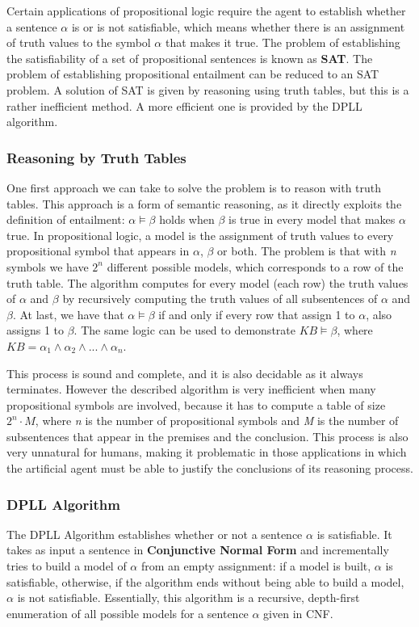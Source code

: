 \documentclass{article}
\begin{document}
Certain applications of propositional logic require the agent to establish whether a sentence \(\alpha\) is or is not satisfiable, which means whether there is an assignment of truth values to the symbol \(\alpha\) that makes it true. The problem of establishing the satisfiability of a set of propositional sentences is known as \textbf{SAT}. The problem of establishing propositional entailment can be reduced to an SAT problem. A solution of SAT is given by reasoning using truth tables, but this is a rather inefficient method. A more efficient one is provided by the DPLL algorithm.

\subsubsection{Reasoning by Truth Tables}
One first approach we can take to solve the problem is to reason with truth tables. This approach is a form of semantic reasoning, as it directly exploits the definition of entailment: \(\alpha\models\beta\) holds when \(\beta\) is true in every model that makes \(\alpha\) true. In propositional logic, a model is the assignment of truth values to every propositional symbol that appears in \(\alpha\), \(\beta\) or both. The problem is that with \textit{n} symbols we have \(2^n\) different possible models, which corresponds to a row of the truth table. The algorithm computes for every model (each row) the truth values of \(\alpha\) and \(\beta\) by recursively computing the truth values of all subsentences of \(\alpha\) and \(\beta\). At last, we have that \(\alpha\models\beta\) if and only if every row that assign 1 to \(\alpha\), also assigns 1 to \(\beta\). The same logic can be used to demonstrate \(KB\models\beta\), where \(KB=\alpha_1\land\alpha_2\land...\land\alpha_n\).

This process is sound and complete, and it is also decidable as it always terminates. However the described algorithm is very inefficient when many propositional symbols are involved, because it has to compute a table of size \(2^n\cdot M\), where \textit{n} is the number of propositional symbols and \textit{M} is the number of subsentences that appear in the premises and the conclusion. This process is also very unnatural for humans, making it problematic in those applications in which the artificial agent must be able to justify the conclusions of its reasoning process.

\subsubsection{DPLL Algorithm}
The DPLL Algorithm establishes whether or not a sentence \(\alpha\) is satisfiable. It takes as input a sentence in \textbf{Conjunctive Normal Form} and incrementally tries to build a model of \(\alpha\) from an empty assignment: if a model is built, \(\alpha\) is satisfiable, otherwise, if the algorithm ends without being able to build a model, \(\alpha\) is not satisfiable. Essentially, this algorithm is a recursive, depth-first enumeration of all possible models for a sentence \(\alpha\) given in CNF.
\end{document}

